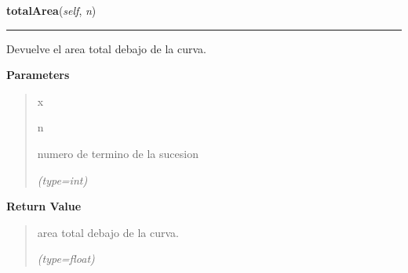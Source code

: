 \hspace{.8\funcindent}\begin{boxedminipage}{\funcwidth}

    \raggedright \textbf{totalArea}(\textit{self}, \textit{n})

    \vspace{-1.5ex}

    \rule{\textwidth}{0.5\fboxrule}
\setlength{\parskip}{2ex}
    Devuelve el area total debajo de la curva.

\setlength{\parskip}{1ex}
      \textbf{Parameters}
      \vspace{-1ex}

      \begin{quote}
        \begin{Ventry}{x}

          \item[n]

          numero de termino de la sucesion

            {\it (type=int)}

        \end{Ventry}

      \end{quote}

      \textbf{Return Value}
    \vspace{-1ex}

      \begin{quote}
      area total debajo de la curva.

      {\it (type=float)}

      \end{quote}

    \end{boxedminipage}

    \label{FractalZE:koch:Koch:totalLength}

    \vspace{0.5ex}

